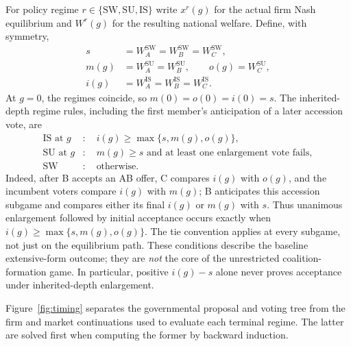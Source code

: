 \documentclass[11pt,a4paper]{article}
\theoremstyle{remark}\newtheorem{remark}[theorem]{Remark}
\newcommand{\SW}{\mathrm{SW}}\newcommand{\SU}{\mathrm{SU}}\newcommand{\IS}{\mathrm{IS}}
\begin{document}
For policy regime $r\in\{\SW,\SU,\IS\}$ write $x^r(g)$ for the actual firm Nash equilibrium and $W^r(g)$ for the resulting national welfare. Define, with symmetry,
\begin{align}\label{eq:payoffs}
s&=W_A^{\SW}=W_B^{\SW}=W_C^{\SW},\nonumber\\
m(g)&=W_A^{\SU}=W_B^{\SU},\qquad o(g)=W_C^{\SU},\nonumber\\
i(g)&=W_A^{\IS}=W_B^{\IS}=W_C^{\IS}.
\end{align}
At $g=0$, the regimes coincide, so $m(0)=o(0)=i(0)=s$. The inherited-depth regime rules, including the first member's anticipation of a later accession vote, are
\begin{align}\label{eq:consent}
\IS\text{ at }g &: \quad i(g)\ge\max\{s,m(g),o(g)\},\\
\SU\text{ at }g &: \quad m(g)\ge s\text{ and at least one enlargement vote fails},\nonumber\\
\SW &: \quad\text{otherwise}.\nonumber
\end{align}
Indeed, after B accepts an AB offer, C compares $i(g)$ with $o(g)$, and the incumbent voters compare $i(g)$ with $m(g)$; B anticipates this accession subgame and compares either its final $i(g)$ or $m(g)$ with $s$. Thus unanimous enlargement followed by initial acceptance occurs exactly when $i(g)\ge\max\{s,m(g),o(g)\}$. The tie convention applies at every subgame, not just on the equilibrium path. These conditions describe the baseline extensive-form outcome; they are \emph{not} the core of the unrestricted coalition-formation game. In particular, positive $i(g)-s$ alone never proves acceptance under inherited-depth enlargement.

Figure~\ref{fig:timing} separates the governmental proposal and voting tree from the firm and market continuations used to evaluate each terminal regime. The latter are solved first when computing the former by backward induction.
\end{document}
